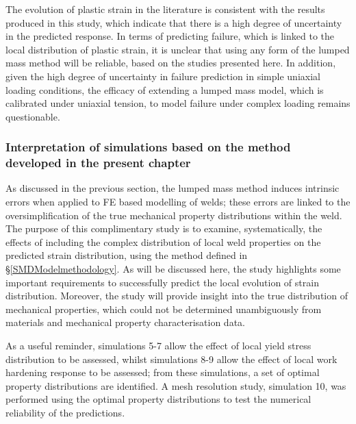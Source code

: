 The evolution of plastic strain in the literature is consistent with the results produced in this study, which indicate that there is a high degree of uncertainty in the predicted response. In terms of predicting failure, which is linked to the local distribution of plastic strain, it is unclear that using any form of the lumped mass method will be reliable, based on the studies presented here. In addition, given the high degree of uncertainty in failure prediction in simple uniaxial loading conditions, the efficacy of extending a lumped mass model, which is calibrated under uniaxial tension, to model failure under complex loading remains questionable. 

\subsubsection{Interpretation of simulations based on the method developed in the present chapter}
\label{SMDModellingstudyDiscussionPropertydistributions}
As discussed in the previous section, the lumped mass method induces intrinsic errors when applied to FE based modelling of welds; these errors are linked to the oversimplification of the true mechanical property distributions within the weld. The purpose of this complimentary study is to examine, systematically, the effects of including the complex distribution of local weld properties on the predicted strain distribution, using the method defined in \S\ref{SMDModelmethodology}. As will be discussed here, the study highlights some important requirements to successfully predict the local evolution of strain distribution. Moreover, the study will provide insight into the true distribution of mechanical properties, which could not be determined unambiguously from materials and mechanical property characterisation data. 

As a useful reminder, simulations 5-7 allow the effect of local yield stress distribution to be assessed, whilst simulations 8-9 allow the effect of local work hardening response to be assessed; from these simulations, a set of optimal property distributions are identified. A mesh resolution study, simulation 10, was performed using the optimal property distributions to test the numerical reliability of the predictions. 

